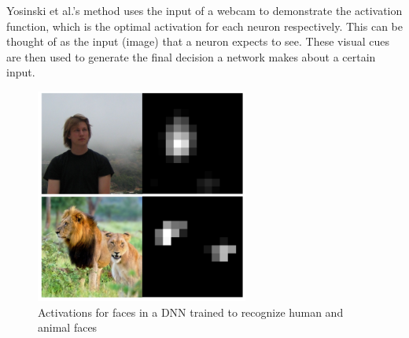 \documentclass{acmsiggraph}               %
\begin{document}
Yosinski et al.'s method uses the input of a webcam to demonstrate the activation function, which is the optimal activation for each neuron respectively. This can be thought of as the input (image) that a neuron expects to see. These visual cues are then used to generate the final decision a network makes about a certain input.

\begin{figure}[H]
\includegraphics[width=2.75in]{detection_yosinski_et_al}
\caption{Activations for faces in a DNN trained to recognize human and animal faces \protect\cite{Yosinski2015}}
\label{fig:face_detection}
\centering
\end{figure}
\end{document}
